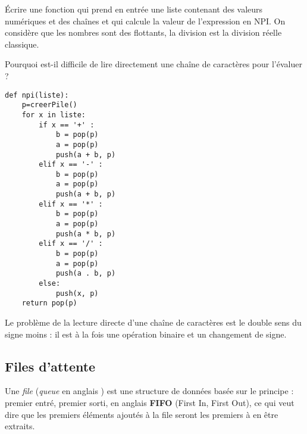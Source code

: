 \begin{Exercise}[title = {Simulation d'une calculatrice}]\it

Écrire une fonction  qui prend en entrée une liste contenant des valeurs numériques et des chaînes  et qui calcule la valeur de l'expression en NPI. On considère que les nombres sont des flottants, la division est la division réelle classique.

Pourquoi est-il difficile de lire directement une chaîne de caractères pour l'évaluer ?
\end{Exercise} 
\begin{Answer}
\begin{lstlisting}
def npi(liste):
    p=creerPile()
    for x in liste:
        if x == '+' :
            b = pop(p)
            a = pop(p)
            push(a + b, p)
        elif x == '-' :
            b = pop(p)
            a = pop(p)
            push(a + b, p)
        elif x == '*' :
            b = pop(p)
            a = pop(p)
            push(a * b, p)
        elif x == '/' :
            b = pop(p)
            a = pop(p)
            push(a . b, p)
        else:
            push(x, p)
    return pop(p)
\end{lstlisting}

Le problème de la lecture directe d'une chaîne de caractères est le double sens du signe moins : il est à la fois une opération binaire et un changement de signe.
\end{Answer}
\subsection{Files d'attente}
Une {\it file} ({\it queue} en anglais ) est une structure de données basée sur le principe : premier entré, premier sorti, en anglais {\bf FIFO} (First In, First Out), ce qui veut dire que les premiers éléments ajoutés à la file seront les premiers à en être extraits. 


